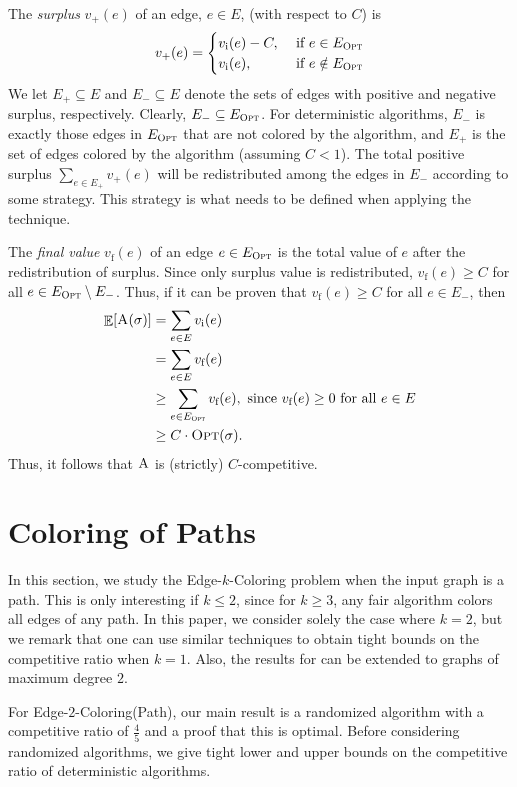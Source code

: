 \documentclass[smallextended]{svjour3}
\def\mck{{\sc Edge-$k$-Coloring}\xspace}
\def\mcpath{{\sc Edge-$2$-Coloring(Path)}\xspace}
\def\paths{\text{\sc Path}\xspace}
\newcommand{\ivalue}{\ensuremath{v_{\text{i}}}\xspace}
\newcommand{\fvalue}{\ensuremath{v_{\text{f}}}\xspace}
\newcommand{\OPT}{\ensuremath{\operatorname{\textsc{Opt}}}\xspace}
\newcommand{\ALG}{\ensuremath{\operatorname{\textsc{A}}}\xspace}
\DeclareMathOperator{\E}{\mathbb{E}}
\begin{document}
The \emph{surplus} $v_{+}(e)$ of an edge, $e\in E$, (with respect to $C$) is 
\begin{equation*}
 v_{+}(e)=\begin{cases} \ivalue(e)-C, & \text{ if $e\in E_{\OPT}$} \\
 \ivalue(e), & \text{ if $e\notin E_{\OPT}$}\end{cases}
\end{equation*}
We let $E_+ \subseteq E$ and $E_- \subseteq E$ denote the sets of
 edges with positive and negative surplus, respectively.
Clearly, $E_- \subseteq E_{\OPT}$.
For deterministic algorithms, $E_-$ is exactly those edges in
 $E_{\OPT}$ that are not colored by the algorithm, and
 $E_+$ is the set of edges colored by the algorithm (assuming
 $C<1$).
The total positive surplus $\sum_{e\in E_+}v_{+}(e)$ will be redistributed among
 the edges in $E_{-}$ according to some strategy. This strategy is
 what needs to be defined when applying the technique. 

The \emph{final value} $\fvalue(e)$ of an edge $e\in E_{\OPT}$ is the
 total value of $e$ after the redistribution of surplus. 
Since only surplus value is redistributed, $\fvalue(e) \geq C$ for all $e
 \in E_{\OPT} \setminus E_-$. 
Thus, if it can be proven that $\fvalue(e) \geq C$ for all $e
 \in E_-$, then
\begin{align*}
\label{Ccomp}
\E[\ALG(\sigma)] 
& = \sum_{e\in E}\ivalue(e)\\
& = \sum_{e\in E}\fvalue(e) \\
& \geq\sum_{e\in E_{\OPT}}\fvalue(e), \text{ since } \fvalue(e) \geq 0
\text{ for all } e \in E\\
& \geq C\cdot\OPT(\sigma).
\end{align*}
Thus, it follows that $\ALG$ is (strictly) $C$-competitive.


\section{Coloring of Paths} 
In this section, we study the \mck problem when the input graph is a
path. 
This is only interesting if $k\leq 2$, since for $k \geq 3$, any fair algorithm 
colors all edges of any path. In this paper, we consider solely the case where $k=2$, but we remark that one can use similar techniques to obtain tight bounds on the competitive ratio when $k=1$. Also, the results for \paths can be extended to graphs of maximum degree $2$.

For \mcpath, our main result is a randomized algorithm with a competitive ratio of $\frac45$ and a proof that this is optimal. Before considering randomized algorithms, we give tight lower and upper bounds on the competitive ratio of deterministic algorithms.
\end{document}
